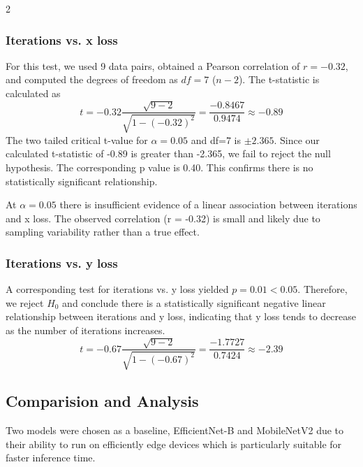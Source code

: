\documentclass[a4paper]{article}
\begin{document}
\begin{multicols}{2}
\subsubsection{Iterations vs. x loss}
\par \noindent
For this test, we used 9 data pairs, obtained a Pearson correlation of $r=-0.32$, and computed the degrees of freedom as $df = 7$ ($n-2$).
The t-statistic is calculated as
$$ t = -0.32 \frac{\sqrt{9-2}}{\sqrt{1 - (-0.32)^2}} = \frac{-0.8467}{0.9474} \approx -0.89 $$
The two tailed critical t-value for $\alpha=0.05$ and df=7 is $\pm2.365$. Since our calculated t-statistic of -0.89 is greater than -2.365, we fail to reject the null hypothesis. The corresponding p value is 0.40. This confirms there is no statistically significant relationship. 

\noindent At $\alpha=0.05$ there is insufficient evidence of a linear association between iterations and x loss. The observed correlation (r = -0.32) is small and likely due to sampling variability rather than a true effect.
\\
\subsubsection{Iterations vs. y loss}
\par \noindent
A corresponding test for iterations vs. y loss yielded $p=0.01<0.05$. Therefore, we reject $H_0$ and conclude there is a statistically significant negative linear relationship between iterations and y loss, indicating that y loss tends to decrease as the number of iterations increases.
$$ t = -0.67 \frac{\sqrt{9-2}}{\sqrt{1 - (-0.67)^2}} = \frac{-1.7727}{0.7424} \approx -2.39 $$

\subsection{Comparision and Analysis}
\par \noindent
Two models were chosen as a baseline, EfficientNet-B\cite{tan2019efficientnet} and MobileNetV2\cite{sandler2018mobilenetv2} due to their ability to run on 
efficiently edge devices which is particularly suitable for faster inference time.

\end{multicols}
\end{document}
